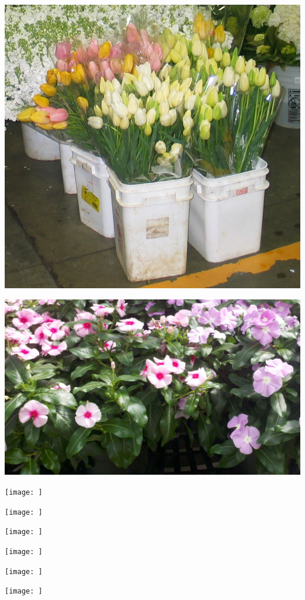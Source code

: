 \documentclass{article}
\begin{document}
\begin{center}
\includegraphics[height=0.9\textheight, angle=90]{../Tulips.jpg}
\end{center}
\newpage

\begin{center}
\includegraphics[height=0.9\textheight, angle=90]{../Vinca.jpg}
\end{center}
\newpage

\begin{center}
\texttt{[image:  ]}
\end{center}
\newpage

\begin{center}
\texttt{[image:  ]}
\end{center}
\newpage

\begin{center}
\texttt{[image:  ]}
\end{center}
\newpage

\begin{center}
\texttt{[image:  ]}
\end{center}
\newpage

\begin{center}
\texttt{[image:  ]}
\end{center}
\newpage

\begin{center}
\texttt{[image:  ]}
\end{center}
\newpage
\end{document}
